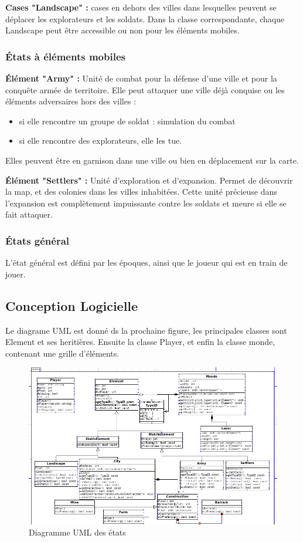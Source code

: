 \documentclass[a4paper,12pt]{article}
\begin{document}
\textbf{Cases "Landscape" :} cases en dehors des villes dans lesquelles peuvent se déplacer les explorateurs et les soldats. Dans la classe correspondante, chaque Landscape peut être accessible ou non pour les éléments mobiles.
\\
\subsubsection{États à éléments mobiles}

\textbf{Élément "Army" :} Unité de combat pour la défense d'une ville et pour la conquête armée de territoire. Elle peut attaquer une ville déjà conquise ou les éléments adversaires hors des villes : \begin{itemize}

\item si elle rencontre un groupe de soldat : simulation du combat

\item si elle rencontre des explorateurs, elle les tue.
\\
\end{itemize}
Elles peuvent être en garnison dans une ville ou bien en déplacement sur la carte.

\textbf{Élément "Settlers" :} Unité d'exploration et d'expansion. Permet de découvrir la map, et des colonies dans les villes inhabitées. Cette unité précieuse dans l'expansion est complètement impuissante contre les soldats et meure si elle se fait attaquer.

\subsubsection{États général}

L'état général est défini par les époques, ainsi que le joueur qui est en train de jouer.


\subsection{Conception Logicielle}

Le diagrame UML est donné ds la prochaine figure, les principales classes sont Element et ses heritières.
Ensuite la classe Player, et enfin la classe monde, contenant une grille d'éléments.

\begin{figure}[H]
\begin{center}
  \includegraphics[width=1\textwidth]{images/UML.png}
  \caption{Diagramme UML des états}
 \end{center}

\end{figure}
\end{document}
